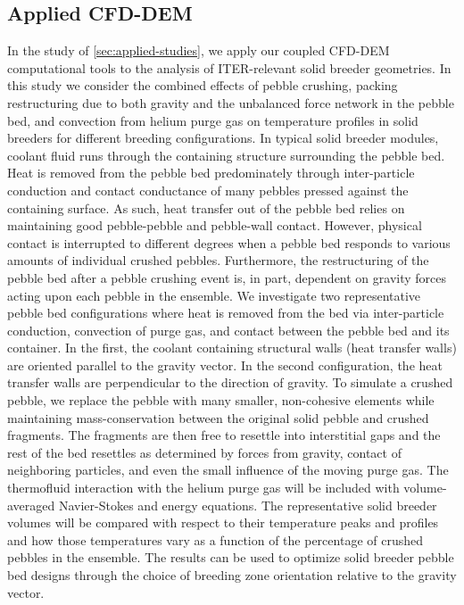 \subsection{Applied CFD-DEM}
In the study of \cref{sec:applied-studies}, we apply our coupled CFD-DEM computational tools to the analysis of ITER-relevant solid breeder geometries. In this study we consider the combined effects of pebble crushing, packing restructuring due to both gravity and the unbalanced force network in the pebble bed, and convection from helium purge gas on temperature profiles in solid breeders for different breeding configurations. In typical solid breeder modules, coolant fluid runs through the containing structure surrounding the pebble bed. Heat is removed from the pebble bed predominately through inter-particle conduction and contact conductance of many pebbles pressed against the containing surface. As such, heat transfer out of the pebble bed relies on maintaining good pebble-pebble and pebble-wall contact. However, physical contact is interrupted to different degrees when a pebble bed responds to various amounts of individual crushed pebbles. Furthermore, the restructuring of the pebble bed after a pebble crushing event is, in part, dependent on gravity forces acting upon each pebble in the ensemble. We investigate two representative pebble bed configurations where heat is removed from the bed via inter-particle conduction, convection of purge gas, and contact between the pebble bed and its container. In the first, the coolant containing structural walls (heat transfer walls) are oriented parallel to the gravity vector. In the second configuration, the heat transfer walls are perpendicular to the direction of gravity. To simulate a crushed pebble, we replace the pebble with many smaller, non-cohesive elements while maintaining mass-conservation between the original solid pebble and crushed fragments. The fragments are then free to resettle into interstitial gaps and the rest of the bed resettles as determined by forces from gravity, contact of neighboring particles, and even the small influence of the moving purge gas. The thermofluid interaction with the helium purge gas will be included with volume-averaged Navier-Stokes and energy equations. The representative solid breeder volumes will be compared with respect to their temperature peaks and profiles and how those temperatures vary as a function of the percentage of crushed pebbles in the ensemble. The results can be used to optimize solid breeder pebble bed designs through the choice of breeding zone orientation relative to the gravity vector.


